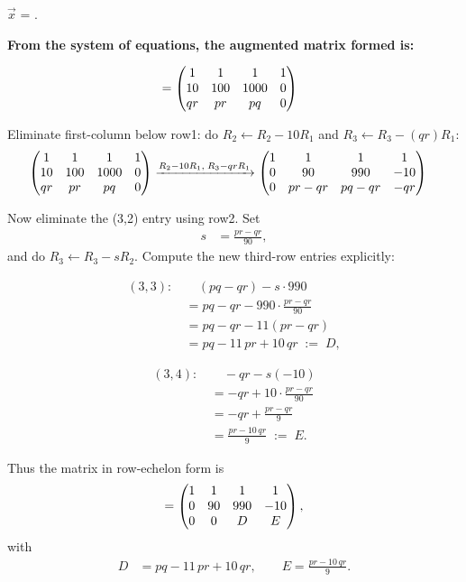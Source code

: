 \documentclass[12pt]{article}
\begin{document}

 $\vec{x}$
=
.


\noindent\textbf{From the system of equations, the augmented matrix formed is:}

\begin{align}
[\,\myvec{M}\mid \vec b\,]
&= \myvec{1 & 1 & 1 & 1 \\
10 & 100 & 1000 & 0 \\
qr & pr & pq & 0}
\end{align}

Eliminate first-column below row1: do \(R_2\leftarrow R_2-10R_1\) and \(R_3\leftarrow R_3-(qr)R_1\):
\begin{align}
\begin{pmatrix}1 & 1 & 1 & 1 \\
10 & 100 & 1000 & 0 \\
qr & pr & pq & 0\end{pmatrix}
&\xrightarrow{R_2-10R_1,\;R_3-qrR_1}
\begin{pmatrix}1 & 1 & 1 & 1 \\
0 & 90 & 990 & -10 \\
0 & pr-qr & pq-qr & -qr\end{pmatrix}
\end{align}

Now eliminate the (3,2) entry using row2. Set
\begin{align}
s &= \frac{pr-qr}{90},
\end{align}
and do \(R_3\leftarrow R_3 - sR_2\). Compute the new third-row entries explicitly:

\begin{align}
(3,3)\text{: }&\quad (pq-qr) - s\cdot 990
\\
&= pq-qr - 990\cdot\frac{pr-qr}{90}
\\
&= pq-qr - 11(pr-qr)
\\
&= pq - 11\,pr + 10\,qr \;:=\; D,
\end{align}

\begin{align}
(3,4)\text{: }&\quad -qr - s(-10)
\\
&= -qr + 10\cdot\frac{pr-qr}{90}
\\
&= -qr + \frac{pr-qr}{9}
\\
&= \frac{pr - 10\,qr}{9} \;:=\; E.
\end{align}

Thus the matrix in row-echelon form is
\begin{align}
[\,\myvec{M}\mid \vec b\,] =
\myvec{1 & 1 & 1 & 1 \\
0 & 90 & 990 & -10 \\
0 & 0 & D & E},
\end{align}
with
\begin{align}
D &= pq - 11\,pr + 10\,qr, \qquad E = \frac{pr - 10\,qr}{9}.
\end{align}
\end{document}
